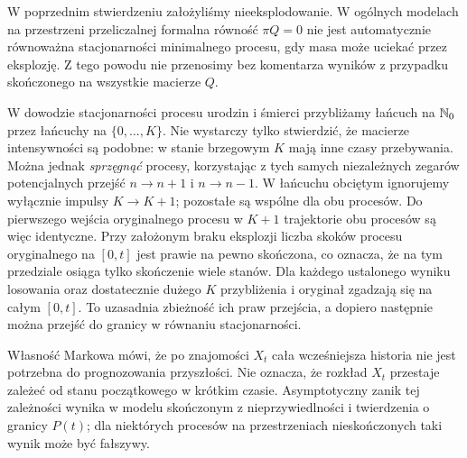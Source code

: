 \begin{uwaga}
W poprzednim stwierdzeniu założyliśmy nieeksplodowanie.
W ogólnych modelach na przestrzeni przeliczalnej
formalna równość $\pi Q=0$ nie jest automatycznie
równoważna stacjonarności minimalnego procesu,
gdy masa może uciekać przez eksplozję. Z tego powodu
nie przenosimy bez komentarza wyników z przypadku
skończonego na wszystkie macierze $Q$.
\end{uwaga}


\begin{uwaga}
W dowodzie stacjonarności procesu urodzin i śmierci
przybliżamy łańcuch na $\mathbb{N}_0$ przez łańcuchy na
$\{0,\ldots,K\}$. Nie wystarczy tylko stwierdzić, że
macierze intensywności są podobne: w stanie brzegowym $K$
mają inne czasy przebywania. Można jednak \emph{sprzęgnąć}
procesy, korzystając z tych samych niezależnych zegarów
potencjalnych przejść $n\to n+1$ i $n\to n-1$.
W łańcuchu obciętym ignorujemy wyłącznie impulsy
$K\to K+1$; pozostałe są wspólne dla obu procesów.
Do pierwszego wejścia oryginalnego procesu w $K+1$
trajektorie obu procesów są więc identyczne.
Przy założonym braku eksplozji liczba skoków procesu
oryginalnego na $[0,t]$ jest prawie na pewno skończona,
co oznacza, że na tym przedziale osiąga tylko skończenie
wiele stanów. Dla każdego ustalonego wyniku losowania
oraz dostatecznie dużego $K$ przybliżenia i oryginał
zgadzają się na całym $[0,t]$.
To uzasadnia zbieżność ich praw przejścia, a dopiero
następnie można przejść do granicy w równaniu stacjonarności.
\end{uwaga}

\begin{uwaga}
Własność Markowa mówi, że po znajomości $X_t$ cała
wcześniejsza historia nie jest potrzebna do prognozowania
przyszłości. Nie oznacza, że rozkład $X_t$ przestaje
zależeć od stanu początkowego w krótkim czasie.
Asymptotyczny zanik tej zależności wynika w modelu
skończonym z nieprzywiedlności i twierdzenia o granicy
$P(t)$; dla niektórych procesów na przestrzeniach
nieskończonych taki wynik może być fałszywy.
\end{uwaga}

